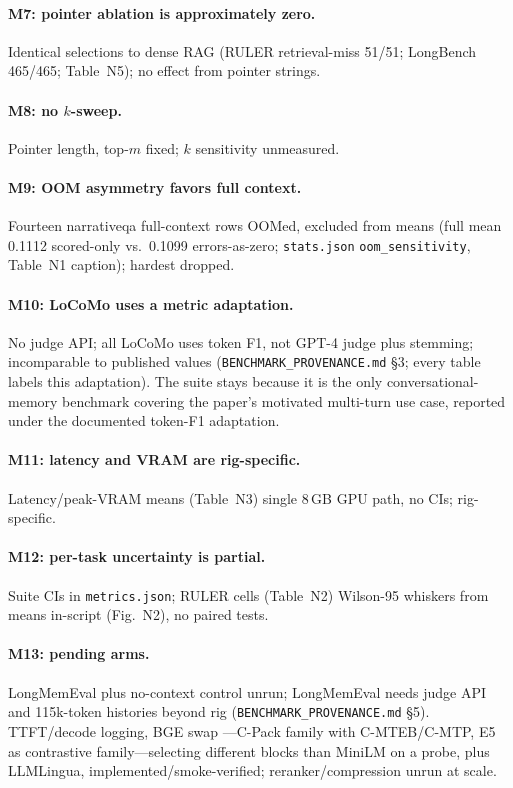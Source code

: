 \paragraph{M7: pointer ablation is approximately zero.}
Identical selections to dense RAG (RULER retrieval-miss 51/51; LongBench 465/465; Table~N5); no effect from pointer strings.

\paragraph{M8: no $k$-sweep.}
Pointer length, top-$m$ fixed; $k$ sensitivity unmeasured.

\paragraph{M9: OOM asymmetry favors full context.}
Fourteen narrativeqa full-context rows OOMed, excluded from means (full mean 0.1112 scored-only vs.\ 0.1099 errors-as-zero; \texttt{stats.json} \texttt{oom\_sensitivity}, Table~N1 caption); hardest dropped.

\paragraph{M10: LoCoMo uses a metric adaptation.}
No judge API; all LoCoMo uses token F1, not GPT-4 judge plus stemming; incomparable to published values (\texttt{BENCHMARK\_PROVENANCE.md} \S3; every table labels this adaptation). The suite stays because it is the only conversational-memory benchmark covering the paper's motivated multi-turn use case, reported under the documented token-F1 adaptation.

\paragraph{M11: latency and VRAM are rig-specific.}
Latency/peak-VRAM means (Table~N3) single 8\,GB GPU path, no CIs; rig-specific.

\paragraph{M12: per-task uncertainty is partial.}
Suite CIs in \texttt{metrics.json}; RULER cells (Table~N2) Wilson-95 whiskers from means in-script (Fig.~N2), no paired tests.

\paragraph{M13: pending arms.}
LongMemEval \cite{wu2024longmemeval} plus no-context control unrun; LongMemEval needs judge API and 115k-token histories beyond rig (\texttt{BENCHMARK\_PROVENANCE.md} \S5). TTFT/decode logging, BGE swap \cite{xiao2023bge}---C-Pack family with C-MTEB/C-MTP, E5 \cite{wang2022e5} as contrastive family---selecting different blocks than MiniLM on a probe, plus LLMLingua, implemented/smoke-verified; reranker/compression unrun at scale.

